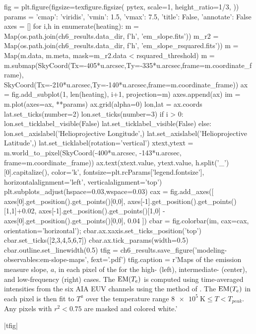 \begin{pycode}
fig = plt.figure(figsize=texfigure.figsize(
    pytex,
    scale=1,
    height_ratio=1/3,
))
params = {'cmap': 'viridis', 'vmin': 1.5, 'vmax': 7.5, 'title': False, 'annotate': False}
axes = []
for i,h in enumerate(heating):
    m = Map(os.path.join(ch6_results.data_dir, f'{h}', 'em_slope.fits'))
    m_r2 = Map(os.path.join(ch6_results.data_dir, f'{h}', 'em_slope_rsquared.fits'))
    m = Map(m.data, m.meta, mask=m_r2.data < rsquared_threshold)
    m = m.submap(SkyCoord(Tx=-405*u.arcsec,Ty=-335*u.arcsec,frame=m.coordinate_frame),
                 SkyCoord(Tx=-210*u.arcsec,Ty=-140*u.arcsec,frame=m.coordinate_frame))
    ax = fig.add_subplot(1, len(heating), i+1, projection=m)
    axes.append(ax)
    im = m.plot(axes=ax, **params)
    ax.grid(alpha=0)
    lon,lat = ax.coords
    lat.set_ticks(number=2)
    lon.set_ticks(number=3)
    if i > 0:
        lon.set_ticklabel_visible(False)
        lat.set_ticklabel_visible(False)
    else:
        lon.set_axislabel('Helioprojective Longitude',)
        lat.set_axislabel('Helioprojective Latitude',)
        lat.set_ticklabel(rotation='vertical')
    xtext,ytext = m.world_to_pixel(SkyCoord(-400*u.arcsec, -143*u.arcsec, frame=m.coordinate_frame))
    ax.text(xtext.value, ytext.value, h.split('_')[0].capitalize(),
            color='k', fontsize=plt.rcParams['legend.fontsize'],
            horizontalalignment='left', verticalalignment='top')
plt.subplots_adjust(hspace=0.03,wspace=0.03)
cax = fig.add_axes([
    axes[0].get_position().get_points()[0,0],
    axes[-1].get_position().get_points()[1,1]+0.02,
    axes[-1].get_position().get_points()[1,0] - axes[0].get_position().get_points()[0,0],
    0.04
])
cbar = fig.colorbar(im, cax=cax, orientation='horizontal');
cbar.ax.xaxis.set_ticks_position('top')
cbar.set_ticks([2,3,4,5,6,7])
cbar.ax.tick_params(width=0.5)
cbar.outline.set_linewidth(0.5)
tfig = ch6_results.save_figure('modeling-observables:em-slope-maps', fext='.pdf')
tfig.caption = r'Maps of the emission measure slope, $a$, in each pixel of the \AR{} for the high- (left), intermediate- (center), and low-frequency (right) cases. The $\textup{EM}(T_e)$ is computed using time-averaged intensities from the six AIA EUV channels using the method of \citet{hannah_differential_2012}. The $\textup{EM}(T_e)$ in each pixel is then fit to $T^a$ over the temperature range $\SI{8e5}{\kelvin}\le T< T_{peak}$. Any pixels with $r^2<0.75$ are masked and colored white.'
\end{pycode}
|tfig|

